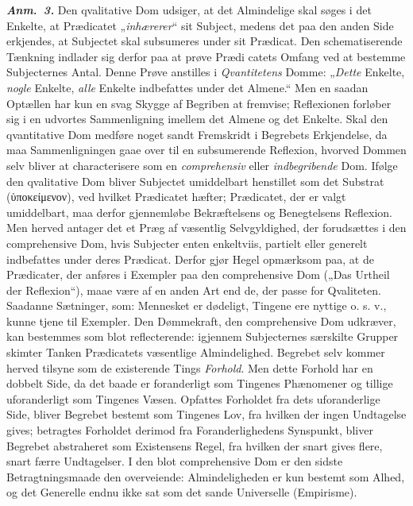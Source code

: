 \documentclass[12pt]{book}
\newcommand{\anm}[1]{\emph{\textbf{Anm.~#1.}}}
\newcommand{\opage}[1]{\marginnote{\footnotesize\textit{[#1]}}}
\begin{document}
\anm{3} Den qvalitative Dom udsiger, at det Almindelige skal søges i det
Enkelte, at Prædicatet „\emph{inhærerer}“ sit Subject, medens det paa den anden
Side erkjendes, at Subjectet skal subsumeres under sit Prædicat. Den
schematiserende Tænkning indlader sig derfor paa at prøve Prædi%
\opage{50}catets Omfang ved at bestemme Subjecternes Antal. Denne Prøve anstilles i
\emph{Qvantitetens} Domme: „\emph{Dette} Enkelte, \emph{nogle} Enkelte,
\emph{alle} Enkelte indbefattes under det Almene.“ Men en saadan Optællen har
kun en svag Skygge af Begriben at fremvise; Reflexionen forløber sig i en
udvortes Sammenligning imellem det Almene og det Enkelte. Skal den qvantitative
Dom medføre noget sandt Fremskridt i Begrebets Erkjendelse, da maa
Sammenligningen gaae over til en subsumerende Reflexion, hvorved Dommen selv
bliver at characterisere som en \emph{comprehensiv} eller \emph{indbegribende}
Dom. Ifølge den qvalitative Dom bliver Subjectet umiddelbart henstillet som det
Substrat (ὑποκείμενον), ved hvilket Prædicatet hæfter; Prædicatet, der er valgt
umiddelbart, maa derfor gjennemløbe Bekræftelsens og Benegtelsens Reflexion. Men
herved antager det et Præg af væsentlig Selvgyldighed, der forudsættes i den
comprehensive Dom, hvis Subjecter enten enkeltviis, partielt eller generelt
indbefattes under deres Prædicat. Derfor gjør Hegel opmærksom paa, at de
Prædicater, der anføres i Exempler paa den comprehensive Dom („Das Urtheil der
Reflexion“), maae være af en anden Art end de, der passe for Qvaliteten.
Saadanne Sætninger, som: Mennesket er dødeligt, Tingene ere nyttige o. s. v.,
kunne tjene til Exempler. Den Dømmekraft, den comprehensive Dom udkræver, kan
bestemmes som blot reflecterende: igjennem Subjecternes særskilte Grupper
skimter Tanken Prædicatets væsentlige Almindelighed. Begrebet selv kommer
herved tilsyne som de existerende Tings \emph{Forhold}. Men dette Forhold har en
dobbelt Side, da det baade er foranderligt som Tingenes Phænomener og tillige
uforanderligt som Tingenes Væsen. Opfattes Forholdet fra dets uforanderlige
Side, bliver Begrebet bestemt som Tingenes Lov, fra hvilken der
\opage{51} ingen Undtagelse gives; betragtes Forholdet derimod fra Foranderlighedens
Synspunkt, bliver Begrebet abstraheret som Existensens Regel, fra hvilken der
snart gives flere, snart færre Undtagelser. I den blot comprehensive Dom er den
sidste Betragtningsmaade den overveiende: Almindeligheden er kun bestemt som
Alhed, og det Generelle endnu ikke sat som det sande Universelle (Empirisme).
\end{document}
